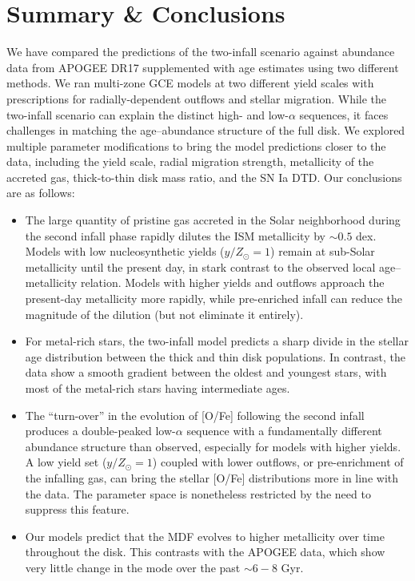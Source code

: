 \documentclass[twocolumn,twocolappendix,linenumbers]{aastex631}
\newcommand{\yZ}[1]{$y/Z_\odot=#1$}
\begin{document}
\section{Summary \& Conclusions}
\label{sec:conclusions}

We have compared the predictions of the two-infall scenario against abundance data from APOGEE DR17 supplemented with age estimates using two different methods. We ran multi-zone GCE models at two different yield scales with prescriptions for radially-dependent outflows and stellar migration. While the two-infall scenario can explain the distinct high- and low-$\alpha$ sequences, it faces challenges in matching the age--abundance structure of the full disk. We explored multiple parameter modifications to bring the model predictions closer to the data, including the yield scale, radial migration strength, metallicity of the accreted gas, thick-to-thin disk mass ratio, and the SN Ia DTD. Our conclusions are as follows:

\begin{itemize}
    \item The large quantity of pristine gas accreted in the Solar neighborhood during the second infall phase rapidly dilutes the ISM metallicity by $\sim0.5$ dex. Models with low nucleosynthetic yields (\yZ{1}) remain at sub-Solar metallicity until the present day, in stark contrast to the observed local age--metallicity relation. Models with higher yields and outflows approach the present-day metallicity more rapidly, while pre-enriched infall can reduce the magnitude of the dilution (but not eliminate it entirely). %
    \item For metal-rich stars, the two-infall model predicts a sharp divide in the stellar age distribution between the thick and thin disk populations. In contrast, the data show a smooth gradient between the oldest and youngest stars, with most of the metal-rich stars having intermediate ages.
    \item The ``turn-over'' in the evolution of [O/Fe] following the second infall produces a double-peaked low-$\alpha$ sequence with a fundamentally different abundance structure than observed, especially for models with higher yields. A low yield set (\yZ{1}) coupled with lower outflows, or pre-enrichment of the infalling gas, can bring the stellar [O/Fe] distributions more in line with the data. The parameter space is nonetheless restricted by the need to suppress this feature.
    \item Our models predict that the MDF evolves to higher metallicity over time throughout the disk. This contrasts with the APOGEE data, which show very little change in the mode over the past $\sim6-8$ Gyr.
\end{itemize}
\end{document}

